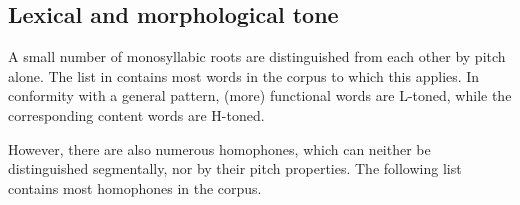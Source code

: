 \subsection{Lexical and morphological tone}

A small number of monosyllabic roots are distinguished from each other by pitch alone. The list in  contains most words in the corpus to which this applies. In conformity with a general pattern, (more) functional words are L-toned, while the corresponding content words are H-toned.


However, there are also numerous homophones, which can neither be distinguished segmentally, nor by their pitch properties. The following list contains most homophones in the corpus.

